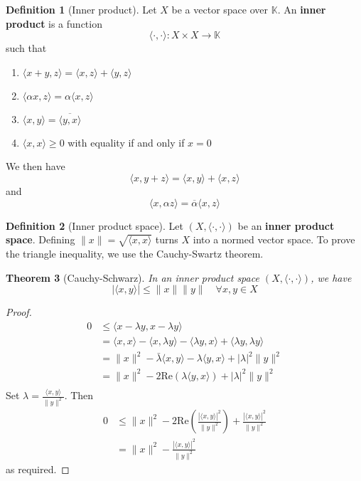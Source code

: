 \documentclass[justified]{tufte-book}
\theoremstyle{plain}%
\newtheorem{thm}{Theorem}[chapter]
\theoremstyle{definition}
\newtheorem{defn}[thm]{Definition}
\theoremstyle{remark}
\newcommand{\K}{\mathbb{K}}
\renewcommand{\Re}{\text{Re}}
\begin{document}
\begin{defn}[Inner product]
  Let $X$ be a vector space over $\K$.  
  An \textbf{inner product} is a function \[
  \langle \cdot, \cdot \rangle : X \times X \rightarrow \K 
  \] such that 
  \begin{enumerate}[(1)]
      \item $\langle x + y, z \rangle = \langle x, z \rangle + \langle y, z \rangle$
      \item $\langle \alpha x, z \rangle = \alpha \langle x, z \rangle$
      \item $\langle x, y \rangle = \overline{ \langle y, x \rangle}$
      \item $\langle x, x \rangle \geq 0$ with equality if and only if $x = 0$
  \end{enumerate}
  We then have \[
      \langle x, y + z \rangle = \langle x, y \rangle + \langle x, z \rangle
  \] and \[
      \langle x, \alpha z \rangle = \overline \alpha \langle x, z \rangle
  \]
\end{defn}

\begin{defn}[Inner product space]
  Let $(X, \langle \cdot, \cdot \rangle)$ be an \textbf{inner product space}.  Defining $\| x \| = \sqrt{ \langle x, x \rangle}$ turns $X$ into a normed vector space.  To prove the triangle inequality, we use the Cauchy-Swartz theorem.
\end{defn}

\begin{thm}[Cauchy-Schwarz]
  In an inner product space $(X, \langle \cdot, \cdot \rangle)$, we have \[
      | \langle x, y \rangle | \leq \|x \| \| y \| \quad \forall x, y  \in X
  \] 
\end{thm}
\begin{proof}
  \begin{align*}
      0   &\leq \langle x - \lambda y, x - \lambda y \rangle \\
          &= \langle x, x \rangle - \langle x, \lambda y \rangle - \langle \lambda y, x \rangle +\langle \lambda y, \lambda y \rangle  \\
          &= \| x \|^2 - \bar \lambda \langle x, y \rangle - \lambda \langle y, x \rangle + |\lambda|^2 \| y \|^2 \\
          &= \| x \|^2 - 2 \Re ( \lambda \langle y, x \rangle ) + |\lambda|^2 \| y \|^2 \\
  \end{align*}  Set $\lambda = \frac{\langle x, y \rangle}{\| y \|^2}$.  Then
  \begin{align*}
      0 &\leq \| x \|^2 - 2 \Re ( \frac{|\langle x, y \rangle|^2}{\| y \|^2} ) + \frac{|\langle x, y \rangle|^2}{\| y \|^2} \\
          &= \| x \|^2 - \frac{|\langle x, y \rangle|^2}{\| y \|^2}
  \end{align*} as required.
\end{proof}
\end{document}
